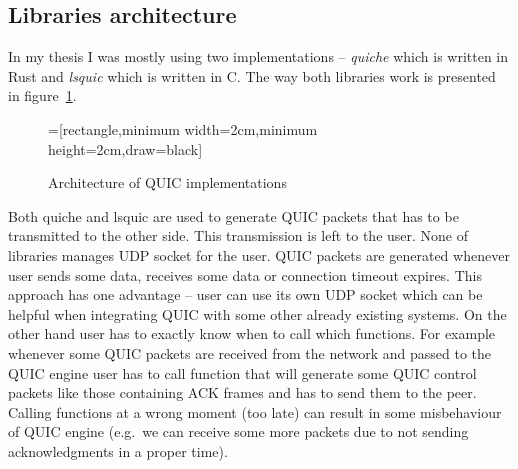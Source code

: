 \subsection{Libraries architecture}
\label{subsec:libraries-architecture}
In my thesis I was mostly using two implementations -- \textit{quiche} which is written in Rust and \textit{lsquic} which is written in C\@.
The way both libraries work is presented in figure~\ref{fig:quic-implementations-architecture}.
\begin{figure}
    \centering
    =[rectangle,minimum width=2cm,minimum height=2cm,draw=black]
    \caption{Architecture of QUIC implementations}
    \label{fig:quic-implementations-architecture}
\end{figure}
Both quiche and lsquic are used to generate QUIC packets that has to be transmitted to the other side.
This transmission is left to the user.
None of libraries manages UDP socket for the user.
QUIC packets are generated whenever user sends some data, receives some data or connection timeout expires.
This approach has one advantage -- user can use its own UDP socket which can be helpful when integrating QUIC
with some other already existing systems.
On the other hand user has to exactly know when to call which functions.
For example whenever some QUIC packets are received from the network and passed to the QUIC engine
user has to call function that will generate some QUIC control packets like those containing ACK frames
and has to send them to the peer.
Calling functions at a wrong moment (too late) can result in some misbehaviour of QUIC engine (e.g.\
we can receive some more packets due to not sending acknowledgments in a proper time).

